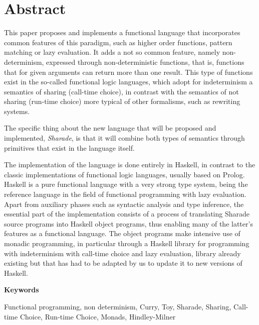 \documentclass[class=article, crop=false]{standalone}
\begin{document}
\section{Abstract}

This paper proposes and implements a functional language that incorporates common features of
this paradigm, such as higher order functions, pattern matching or lazy evaluation. It adds a
not so common feature, namely non-determinism, expressed through non-deterministic functions,
that is, functions that for given arguments can return more than one result. This type of
functions exist in the so-called functional logic languages, which adopt for indeterminism a
semantics of sharing (call-time choice), in contrast with the semantics of not sharing
(run-time choice) more typical of other formalisms, such as rewriting systems.

The specific thing about the new language that will be proposed and implemented,
\textit{Sharade}, is that it will combine both types of semantics through primitives that
exist in the language itself.

The implementation of the language is done entirely in Haskell, in contrast to the classic
implementations of functional logic languages, usually based on Prolog. Haskell is a pure
functional language with a very strong type system, being the reference language in the field
of functional programming with lazy evaluation. Apart from auxiliary phases such as syntactic
analysis and type inference, the essential part of the implementation consists of a
process of translating Sharade source programs into Haskell object programs, thus enabling
many of the latter's features as a functional language. The object programs make intensive
use of monadic programming, in particular through a Haskell library for programming with
indeterminism with call-time choice and lazy evaluation, library already existing but that
has had to be adapted by us to update it to new versions of Haskell.

\vspace{0.5cm}
\textbf{Keywords}

Functional programming, non determinism, Curry, Toy, Sharade, Sharing, Call-time Choice,
Run-time Choice, Monads, Hindley-Milner
\end{document}

